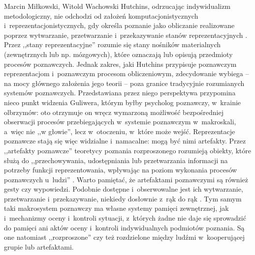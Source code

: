 \begin{artplenv2auth}{Marcin Miłkowski, Witold Wachowski}
Hutchins, odrzucając indywidualizm metodologiczny, nie odchodzi od założeń komputacjonistycznych i~reprezentacjonistycznych, gdy określa poznanie jako obliczanie realizowane poprzez wytwarzanie, przetwarzanie i~przekazywanie stanów reprezentacyjnych
\parencite[][s.~49]{hutchins_cognition_1995}. %
 Przez ,,stany reprezentacyjne'' rozumie się stany nośników materialnych (zewnętrznych lub np. mózgowych), które oznaczają lub opisują przedmioty procesów poznawczych. Jednak zakres, jaki Hutchins przypisuje poznawczym reprezentacjom i~poznawczym procesom obliczeniowym, zdecydowanie wybiega -- na mocy głównego założenia jego teorii -- poza granice tradycyjnie rozumianych systemów poznawczych. Przedstawiana przez niego perspektywa przypomina nieco punkt widzenia Guliwera, którym byłby psycholog poznawczy, w~krainie olbrzymów: oto otrzymuje on wręcz wymarzoną możliwość bezpośredniej obserwacji procesów przebiegających w~systemie poznawczym w~makroskali, a~więc nie ,,w głowie'', lecz w~otoczeniu, w~które może wejść. Reprezentacje poznawcze stają się więc widzialne i~namacalne: mogą być nimi artefakty. Przez ,,artefakty poznawcze'' teoretycy poznania rozproszonego rozumieją obiekty, które służą do ,,przechowywania, udostępniania lub przetwarzania informacji na potrzeby funkcji reprezentowania, wpływając na poziom wykonania procesów poznawczych u~ludzi'' 
\parencite[][s.~11]{norman_cognitive_1991}. %
 Warto pamiętać, że artefaktami poznawczymi są również gesty czy wypowiedzi. Podobnie dostępne i~obserwowalne jest ich wytwarzanie, przetwarzanie i~przekazywanie, niekiedy dosłownie z~rąk do rąk 
\parencite[][s.~128–129]{hutchins_cognition_1995}. %
 Tym samym taki makrosystem poznawczy ma własne systemy pamięci zewnętrznej, jak i~mechanizmy oceny i~kontroli sytuacji, z~których żadne nie daje się sprowadzić do pamięci ani aktów oceny i~kontroli indywidualnych podmiotów poznania. Są one natomiast ,,rozproszone'' czy też rozdzielone między ludźmi w~kooperującej grupie lub artefaktami.


\end{artplenv2auth}
